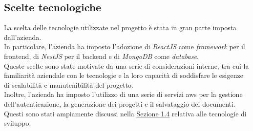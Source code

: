 \subsection{Scelte tecnologiche}
\label{subsec:scelte-tecnologiche}

La scelta delle tecnologie utilizzate nel progetto è stata in gran parte imposta dall'azienda.\\
In particolare, l'azienda ha imposto l'adozione di \textit{ReactJS} come \textit{framework} per il \gls{frontend}, di \textit{NestJS} per il \gls{backend} e di \textit{MongoDB} come \textit{database}.\\
Queste scelte sono state motivate da una serie di considerazioni interne, tra cui la familiarità aziendale con le tecnologie e la loro capacità di soddisfare le esigenze di scalabilità e manutenibilità del progetto.\\

\noindent Inoltre, l'azienda ha imposto l'utilizzo di una serie di servizi \gls{aws} per la gestione dell'autenticazione, la generazione dei progetti e il salvataggio dei documenti.\\
Questi sono stati ampiamente discussi nella {\hyperref[sez:tecnologie-sviluppo]{Sezione 1.4}} relativa alle tecnologie di sviluppo.
